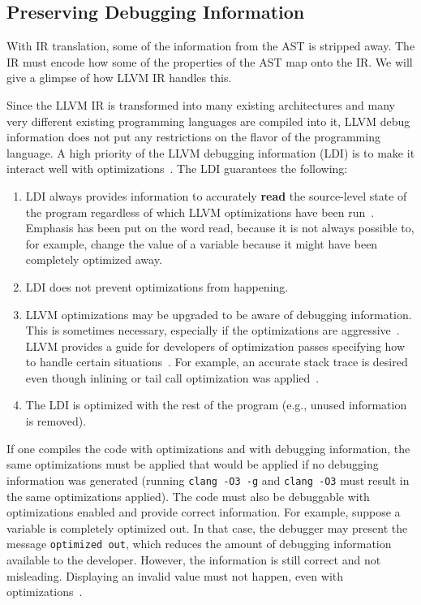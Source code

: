 \subsection{Preserving Debugging Information}
With IR translation, some of the information from the AST is stripped away. The
IR must encode how some of the properties of the AST map onto the IR. We will
give a glimpse of how LLVM IR handles this.

Since the LLVM IR is transformed into many existing architectures and many very
different existing programming languages are compiled into it, LLVM debug
information does not put any restrictions on the flavor of the programming
language. A high priority of the LLVM debugging information (LDI) is to make it
interact well with optimizations~\cite{llvm-debug-info}. The LDI guarantees the
following:
\begin{enumerate}
    \item LDI always provides information to accurately \textbf{read} the
        source-level state of the program regardless of which LLVM
        optimizations have been run~\cite{llvm-debug-info}. Emphasis has been
        put on the word read, because it is not always possible to, for
        example, change the value of a variable because it might have been
        completely optimized away.
    \item LDI does not prevent optimizations from happening.
    \item LLVM optimizations may be upgraded to be aware of debugging
        information. This is sometimes necessary, especially if the
        optimizations are aggressive~\cite{llvm-debug-info}. LLVM provides a
        guide for developers of optimization passes specifying how to handle
        certain situations~\cite{llvm-debug-optimizations}. For example,
        an accurate stack trace is desired even though inlining or tail call
        optimization was applied~\cite{llvm-debug-info}.
    \item The LDI is optimized with the rest of the program (e.g., unused
        information is removed).
\end{enumerate}
If one compiles the code with optimizations and with debugging information, the
same optimizations must be applied that would be applied if no debugging
information was generated (running \texttt{clang -O3 -g} and \texttt{clang -O3}
must result in the same optimizations applied). The code must also be
debuggable with optimizations enabled and provide correct information. For
example, suppose a variable is completely optimized out. In that case, the
debugger may present the message \texttt{optimized out}, which reduces the
amount of debugging information available to the developer. However, the
information is still correct and not misleading. Displaying an invalid value
must not happen, even with optimizations~\cite{llvm-debug-info}.

